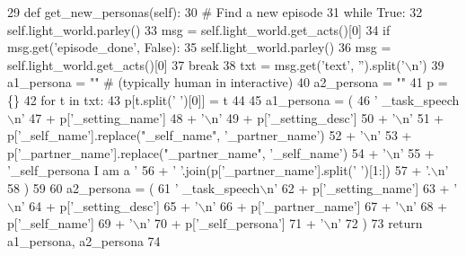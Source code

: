 \begin{DoxyCode}
29     \textcolor{keyword}{def }get\_new\_personas(self):
30         \textcolor{comment}{# Find a new episode}
31         \textcolor{keywordflow}{while} \textcolor{keyword}{True}:
32             self.light\_world.parley()
33             msg = self.light\_world.get\_acts()[0]
34             \textcolor{keywordflow}{if} msg.get(\textcolor{stringliteral}{'episode\_done'}, \textcolor{keyword}{False}):
35                 self.light\_world.parley()
36                 msg = self.light\_world.get\_acts()[0]
37                 \textcolor{keywordflow}{break}
38         txt = msg.get(\textcolor{stringliteral}{'text'}, \textcolor{stringliteral}{''}).split(\textcolor{stringliteral}{'\(\backslash\)n'})
39         a1\_persona = \textcolor{stringliteral}{""}  \textcolor{comment}{# (typically human in interactive)}
40         a2\_persona = \textcolor{stringliteral}{""}
41         p = \{\}
42         \textcolor{keywordflow}{for} t \textcolor{keywordflow}{in} txt:
43             p[t.split(\textcolor{stringliteral}{' '})[0]] = t
44 
45         a1\_persona = (
46             \textcolor{stringliteral}{' \_task\_speech\(\backslash\)n'}
47             + p[\textcolor{stringliteral}{'\_setting\_name'}]
48             + \textcolor{stringliteral}{'\(\backslash\)n'}
49             + p[\textcolor{stringliteral}{'\_setting\_desc'}]
50             + \textcolor{stringliteral}{'\(\backslash\)n'}
51             + p[\textcolor{stringliteral}{'\_self\_name'}].replace(\textcolor{stringliteral}{"\_self\_name"}, \textcolor{stringliteral}{'\_partner\_name'})
52             + \textcolor{stringliteral}{'\(\backslash\)n'}
53             + p[\textcolor{stringliteral}{'\_partner\_name'}].replace(\textcolor{stringliteral}{"\_partner\_name"}, \textcolor{stringliteral}{'\_self\_name'})
54             + \textcolor{stringliteral}{'\(\backslash\)n'}
55             + \textcolor{stringliteral}{'\_self\_persona I am a '}
56             + \textcolor{stringliteral}{' '}.join(p[\textcolor{stringliteral}{'\_partner\_name'}].split(\textcolor{stringliteral}{' '})[1:])
57             + \textcolor{stringliteral}{'.\(\backslash\)n'}
58         )
59 
60         a2\_persona = (
61             \textcolor{stringliteral}{' \_task\_speech\(\backslash\)n'}
62             + p[\textcolor{stringliteral}{'\_setting\_name'}]
63             + \textcolor{stringliteral}{'\(\backslash\)n'}
64             + p[\textcolor{stringliteral}{'\_setting\_desc'}]
65             + \textcolor{stringliteral}{'\(\backslash\)n'}
66             + p[\textcolor{stringliteral}{'\_partner\_name'}]
67             + \textcolor{stringliteral}{'\(\backslash\)n'}
68             + p[\textcolor{stringliteral}{'\_self\_name'}]
69             + \textcolor{stringliteral}{'\(\backslash\)n'}
70             + p[\textcolor{stringliteral}{'\_self\_persona'}]
71             + \textcolor{stringliteral}{'\(\backslash\)n'}
72         )
73         \textcolor{keywordflow}{return} a1\_persona, a2\_persona
74 
\end{DoxyCode}
